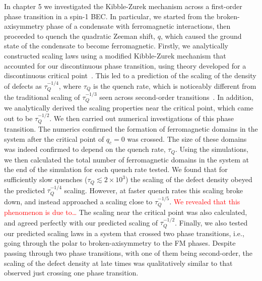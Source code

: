 In chapter 5 we investigated the Kibble-Zurek mechanism across a first-order
phase transition in a spin-1 BEC\@.
In particular, we started from the broken-axisymmetry phase of a condensate with
ferromagnetic interactions, then proceeded to quench the quadratic Zeeman shift,
\(q\), which caused the ground state of the condensate to become ferromagnetic.
Firstly, we analytically constructed scaling laws using a modified Kibble-Zurek
mechanism that accounted for our discontinuous phase transition, using theory
developed for a discontinuous critical point~\cite{Suzuki2015}.
This led to a prediction of the scaling of the density of defects as
\(\tau_Q^{-1/4}\), where \(\tau_Q\) is the quench rate, which is noticeably
different from the traditional scaling of \(\tau_Q^{-1/3}\) seen across
second-order transitions~\cite{Damski2007, Anquez2016}.
In addition, we analytically derived the scaling properties near the critical
point, which came out to be \(\tau_Q^{-1/2}\).
We then carried out numerical investigations of this phase transition.
The numerics confirmed the formation of ferromagnetic domains in the system
after the critical point of \(q_c=0\) was crossed.
The size of these domains was indeed confirmed to depend on the quench rate,
\(\tau_Q\).
Using the simulations, we then calculated the total number of ferromagnetic
domains in the system at the end of the simulation for each quench rate tested.
We found that for sufficiently slow quenches (\(\tau_Q \lesssim 2\times 10^3\))
the scaling of the defect density obeyed the predicted \(\tau_Q^{-1/4}\)
scaling.
However, at faster quench rates this scaling broke down, and instead approached
a scaling close to \(\tau_Q^{-1/5}\).
\textcolor{red}{We revealed that this phenomenon is due to\ldots}
The scaling near the critical point was also calculated, and agreed perfectly
with our predicted scaling of \(\tau_Q^{-1/2}\).
Finally, we also tested our predicted scaling laws in a system that crossed
two phase transitions, i.e., going through the polar to broken-axisymmetry to
the FM phases.
Despite passing through two phase transitions, with one of them being
second-order, the scaling of the defect density at late times was qualitatively
similar to that observed just crossing one phase transition.

